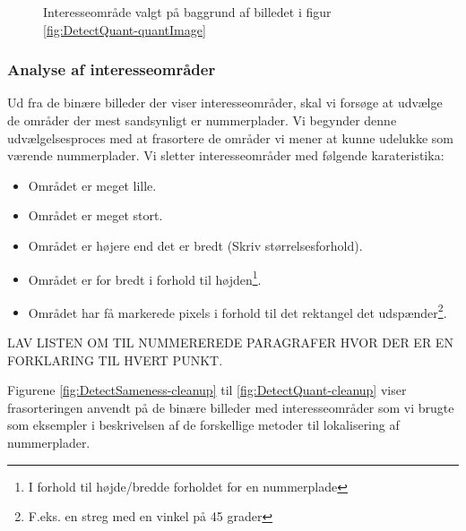 \begin{figure}[htp]
  \centering
  \caption{Interesseområde valgt på baggrund af billedet i figur \vref{fig:DetectQuant-quantImage}}
  \label{fig:DetectQuant-binary}  
\end{figure}


\subsubsection{Analyse af interesseområder}
\label{sec:BinImgCleanup}
Ud fra de binære billeder der viser interesseområder, skal vi forsøge at udvælge de områder der mest sandsynligt er nummerplader. Vi begynder denne udvælgelsesproces med at frasortere de områder vi mener at kunne udelukke som værende nummerplader. Vi sletter interesseområder med følgende karateristika:
\begin{itemize}
\item Området er meget lille.
\item Området er meget stort.
\item Området er højere end det er bredt (Skriv størrelsesforhold).
\item Området er for bredt i forhold til højden\footnote{I forhold til højde/bredde forholdet for en nummerplade}.
\item Området har få markerede pixels i forhold til det rektangel det udspænder\footnote{F.eks. en streg med en vinkel på 45 grader}.
\end{itemize}

LAV LISTEN OM TIL NUMMEREREDE PARAGRAFER HVOR DER ER EN FORKLARING TIL HVERT PUNKT.

Figurene \ref{fig:DetectSameness-cleanup} til \ref{fig:DetectQuant-cleanup} viser frasorteringen anvendt på de binære billeder med interesseområder som vi brugte som eksempler i beskrivelsen af de forskellige metoder til lokalisering af nummerplader. 

